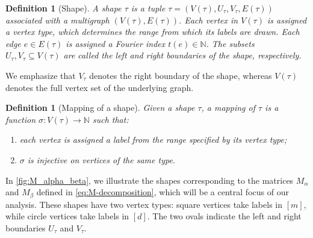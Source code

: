 \documentclass[12pt]{article}
\newtheorem{definition}[theorem]{Definition}
\begin{document}
\begin{definition}[Shape]
A shape \(\tau\) is a tuple
\(
    \tau=(V(\tau),U_\tau,V_\tau,E(\tau))
\)
associated with a multigraph \((V(\tau),E(\tau))\). Each vertex in \(V(\tau)\) is
assigned a vertex type, which determines the range from which its labels are drawn.
Each edge \(e\in E(\tau)\) is assigned a Fourier index \(t(e)\in \mathbb N\).
The subsets \(U_\tau,V_\tau\subseteq V(\tau)\) are called the left and right
boundaries of the shape, respectively.
\end{definition}

We emphasize that \(V_\tau\) denotes the right boundary of the shape, whereas
\(V(\tau)\) denotes the full vertex set of the underlying graph.

\begin{definition}[Mapping of a shape]
Given a shape \(\tau\), a mapping of \(\tau\) is a function
\(
    \sigma:V(\tau)\to \mathbb N
\)
such that:
\begin{enumerate}
    \item each vertex is assigned a label from the range specified by its vertex type;
    \item \(\sigma\) is injective on vertices of the same type.
\end{enumerate}
\end{definition}

In \cref{fig:M_alpha_beta}, we illustrate the shapes corresponding to the matrices
\(M_\alpha\) and \(M_\beta\) defined in \cref{eq:M-decomposition}, which will be a
central focus of our analysis. These shapes have two vertex types: square vertices
take labels in \([m]\), while circle vertices take labels in \([d]\). The two ovals
indicate the left and right boundaries \(U_\tau\) and \(V_\tau\).
\end{document}
